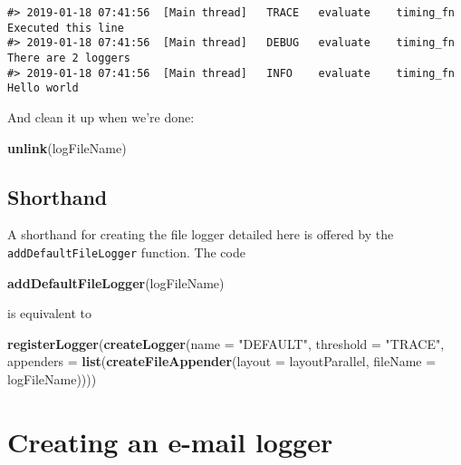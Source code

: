 \documentclass[]{article}
\newenvironment{Shaded}{\begin{snugshade}}{\end{snugshade}}
\newcommand{\DataTypeTok}[1]{\textcolor[rgb]{0.13,0.29,0.53}{#1}}
\newcommand{\KeywordTok}[1]{\textcolor[rgb]{0.13,0.29,0.53}{\textbf{#1}}}
\newcommand{\NormalTok}[1]{#1}
\newcommand{\StringTok}[1]{\textcolor[rgb]{0.31,0.60,0.02}{#1}}
\begin{document}
\begin{verbatim}
#> 2019-01-18 07:41:56  [Main thread]   TRACE   evaluate    timing_fn   Executed this line
#> 2019-01-18 07:41:56  [Main thread]   DEBUG   evaluate    timing_fn   There are 2 loggers
#> 2019-01-18 07:41:56  [Main thread]   INFO    evaluate    timing_fn   Hello world
\end{verbatim}

And clean it up when we're done:

\begin{Shaded}
\begin{Highlighting}[]
\KeywordTok{unlink}\NormalTok{(logFileName)}
\end{Highlighting}
\end{Shaded}

\hypertarget{shorthand-1}{%
\subsection{Shorthand}\label{shorthand-1}}

A shorthand for creating the file logger detailed here is offered by the
\texttt{addDefaultFileLogger} function. The code

\begin{Shaded}
\begin{Highlighting}[]
\KeywordTok{addDefaultFileLogger}\NormalTok{(logFileName)}
\end{Highlighting}
\end{Shaded}

is equivalent to

\begin{Shaded}
\begin{Highlighting}[]
\KeywordTok{registerLogger}\NormalTok{(}\KeywordTok{createLogger}\NormalTok{(}\DataTypeTok{name =} \StringTok{"DEFAULT"}\NormalTok{,}
                            \DataTypeTok{threshold =} \StringTok{"TRACE"}\NormalTok{, }
                            \DataTypeTok{appenders =} \KeywordTok{list}\NormalTok{(}\KeywordTok{createFileAppender}\NormalTok{(}\DataTypeTok{layout =}\NormalTok{ layoutParallel, }
                                                                  \DataTypeTok{fileName =}\NormalTok{ logFileName))))}
\end{Highlighting}
\end{Shaded}

\hypertarget{creating-an-e-mail-logger}{%
\section{Creating an e-mail logger}\label{creating-an-e-mail-logger}}
\end{document}
